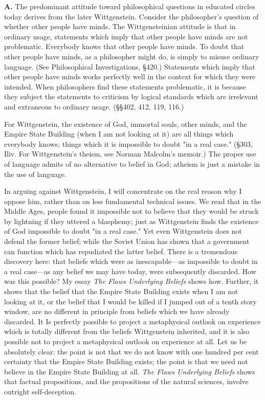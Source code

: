 \documentclass[10pt,twoside,draft]{memoir}
\newcommand{\essaytitle}[1]{
	\emph{#1}}
\begin{document}
\textbf{A.} The predominant attitude toward philosophical questions in 
educated circles today derives from the later Wittgenstein. Consider the 
philosopher's question of whether other people have minds. The 
Wittgensteinian attitude is that in ordinary usage, statements which imply 
that other people have minds are not problematic. Everybody knows that 
other people have minds. To doubt that other people have minds, as a 
philosopher might do, is simply to misuse ordinary language. (See 
Philosophical Investigations, \S 420.) Statements which imply that other 
people have minds works perfectly well in the context for which they were 
intended. When philosophers find these statements problematic, it is because 
they subject the statements to criticism by logical standards which are 
irrelevant and extraneous to ordinary usage. (\S \S 402, 412, 119, 116.) 

For Wittgenstein, the existence of God, immortal souls, other minds, 
and the Empire State Building (when I am not looking at it) are all things 
which everybody knows; things which it is impossible to doubt "in a real 
case." (\S 303, Iliv. For Wittgenstein's theism, see Norman Malcolm's 
memoir.) The proper use of language admits of no alternative to belief in 
God; atheism is just a mistake in the use of language. 


In arguing against Wittgenstein, I will concentrate on the real reason 
why I oppose him, rather than on less fundamental technical issues. We read 
that in the Middle Ages, people found it impossible not to believe that they 
would be struck by lightning if they uttered a blasphemy; just as 
Wittgenstein finds the existence of God impossible to doubt "in a real case." 
Yet even Wittgenstein does not defend the former belief; while the Soviet 
Union has shown that a government can function which has repudiated the 
latter belief. There is a tremendous discovery here: that beliefs which were as 
inescapable---as impossible to doubt in a real case---as any belief we may have 
today, were subsequently discarded. How was this possible? My essay \essaytitle{The 
Flaws Underlying Beliefs} shows how. Further, it shows that the belief that 
the Empire State Building exists when I am not looking at it, or the belief 
that I would be killed if I jumped out of a tenth story window, are no 
different in principle from beliefs which we have already discarded. It Is 
perfectly possible to project a metaphysical outlook on experience which is 
totally different from the beliefs Wittgenstein inherited, and it is also 
possible not to project a metaphysical outlook on experience at all. Let us be 
absolutely clear: the point is not that we do not know with one hundred per 
cent certainty that the Empire State Building exists; the point is that we 
need not believe in the Empire State Building at all. \essaytitle{The Flaws Underlying 
Beliefs} shows that factual propositions, and the propositions of the natural 
sciences, involve outright self-deception. 
\end{document}
